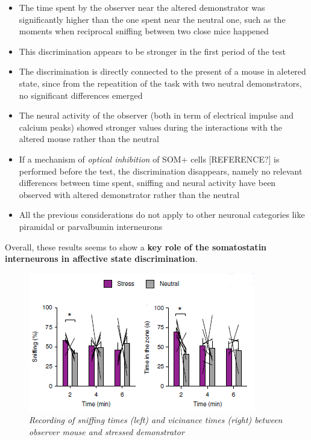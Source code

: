 \documentclass[a4paper]{article}
\begin{document}
 \begin{itemize}
 	
 	\item The time spent by the observer near the altered demonstrator was significantly higher than the one spent near the neutral one, such as the moments when reciprocal sniffing between two close mice happened
 	
 	\item This  discrimination appears to be stronger in the first period of the test
 	
 	\item The discrimination is directly connected to the present of a mouse in aletered state, since from the repeatition of the task with two neutral demonstrators, no significant differences emerged
 	
 	\item The neural activity of the observer (both in term of electrical impulse and  calcium peaks) showed stronger values during the interactions with the altered mouse rather than the neutral
 	
 	\item  If a mechanism of \textit{optical inhibition} of SOM+ cells [REFERENCE?] is performed before the test, the discrimination disappears, namely no relevant differences between time spent, sniffing and neural activity have been observed with altered demonstrator rather than the neutral
 	
 	\item All the previous considerations do not apply to other neuronal categories like piramidal or parvalbumin interneurons
 	 
 \end{itemize}
 
 Overall, these results seems to show a \textbf{key role of the somatostatin interneurons in affective state discrimination}.

	\begin{figure}
	\begin{center}
		\includegraphics[scale=.99]{scheggia.png} 
	\end{center} 
	\caption{\textit{Recording of sniffing times (left) and vicinance times (right) between observer mouse and stressed demonstrator}}
	
\end{figure}
\end{document}
